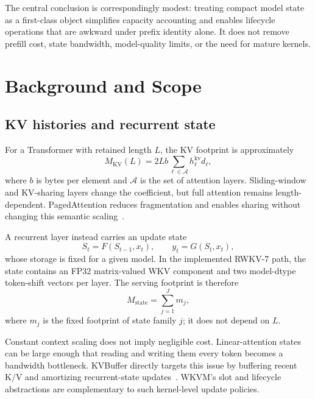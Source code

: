\documentclass[10pt,letterpaper]{article}
\newcommand{\wkvm}{\textsc{WKVM}}
\begin{document}
The central conclusion is correspondingly modest: treating compact model state
as a first-class object simplifies capacity accounting and enables lifecycle
operations that are awkward under prefix identity alone.  It does not remove
prefill cost, state bandwidth, model-quality limits, or the need for mature
kernels.

\section{Background and Scope}

\subsection{KV histories and recurrent state}

For a Transformer with retained length $L$, the KV footprint is approximately
\begin{equation}
  M_{\mathrm{KV}}(L)
  = 2L b \sum_{\ell \in \mathcal{A}} h_{\ell}^{\mathrm{kv}} d_{\ell},
  \label{eq:kv}
\end{equation}
where $b$ is bytes per element and $\mathcal{A}$ is the set of attention
layers.  Sliding-window and KV-sharing layers change the coefficient, but full
attention remains length-dependent.  PagedAttention reduces fragmentation and
enables sharing without changing this semantic scaling~\cite{vllm}.

A recurrent layer instead carries an update state
\begin{equation}
  S_t = F(S_{t-1}, x_t), \qquad y_t = G(S_t, x_t),
  \label{eq:recurrent}
\end{equation}
whose storage is fixed for a given model.  In the implemented RWKV-7 path, the
state contains an FP32 matrix-valued WKV component and two model-dtype
token-shift vectors per layer.  The serving footprint is therefore
\begin{equation}
  M_{\mathrm{state}} = \sum_{j=1}^{J} m_j,
  \label{eq:state}
\end{equation}
where $m_j$ is the fixed footprint of state family $j$; it does not depend on
$L$.

Constant context scaling does not imply negligible cost.  Linear-attention
states can be large enough that reading and writing them every token becomes a
bandwidth bottleneck.  KVBuffer directly targets this issue by buffering recent
K/V and amortizing recurrent-state updates~\cite{kvbuffer}.  \wkvm's slot and
lifecycle abstractions are complementary to such kernel-level update policies.
\end{document}
